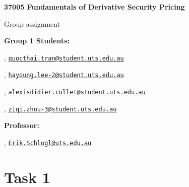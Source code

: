 


\usepackage{listings}


\begin{Large}
    \textsf{\textbf{37005 Fundamentals of Derivative Security Pricing}}
    
    Group assignment
\end{Large}

\vspace{2ex}

\textsf{\textbf{Group 1 Students:}}

, \href{mailto:quocthai.tran@student.uts.edu.au}{\texttt{quocthai.tran@student.uts.edu.au}}

, \href{mailto:hayoung.lee-2@student.uts.edu.au}{\texttt{hayoung.lee-2@student.uts.edu.au}}

, \href{mailto:alexisdidier.cullet@student.uts.edu.au}{\texttt{alexisdidier.cullet@student.uts.edu.au}}

, \href{mailto:ziqi.zhou-3@student.uts.edu.au}{\texttt{ziqi.zhou-3@student.uts.edu.au}}

\textsf{\textbf{Professor:}}

, \href{mailto:Erik.Schlogl@uts.edu.au}{\texttt{Erik.Schlogl@uts.edu.au}}

\section*{Task 1}

